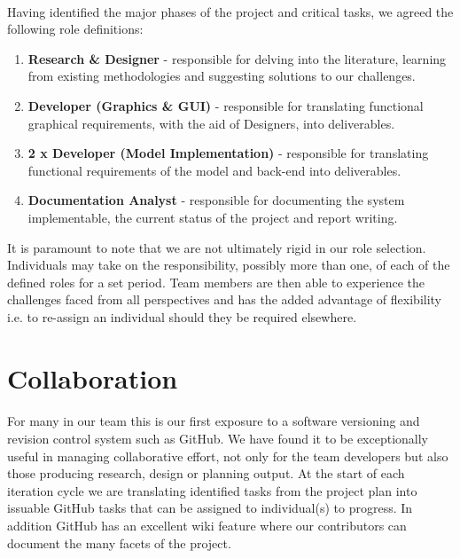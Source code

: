 \documentclass[11pt,a4paper]{article}
\begin{document}
\paragraph{}
Having identified the major phases of the project and critical tasks, we agreed the following role definitions:

\begin{enumerate}
  \item \textbf{Research \& Designer} - responsible for delving into the literature, learning from existing methodologies and suggesting solutions to our challenges.
  \item \textbf{Developer (Graphics \& GUI)} - responsible for translating functional graphical requirements, with the aid of Designers, into deliverables.
  \item \textbf{2 x Developer (Model Implementation)} - responsible for translating functional requirements of the model and back-end into deliverables.
  \item \textbf{Documentation Analyst} - responsible for documenting the system implementable, the current status of the project and report writing.
\end{enumerate}

It is paramount to note that we are not ultimately rigid in our role selection.  Individuals may take on the responsibility, possibly more than one, of each of the defined roles for a set period.  Team members are then able to experience the challenges faced from all perspectives and has the added advantage of flexibility i.e. to re-assign an individual should they be required elsewhere.

\section{Collaboration}
\paragraph{}
For many in our team this is our first exposure to a software versioning and revision control system such as GitHub.  We have found it to be exceptionally useful in managing collaborative effort, not only for the team developers but also those producing research, design or planning output.  At the start of each iteration cycle we are translating identified tasks from the project plan into issuable GitHub tasks that can be assigned to individual(s) to progress.  In addition GitHub has an excellent wiki feature where our contributors can document the many facets of the project.
\end{document}
